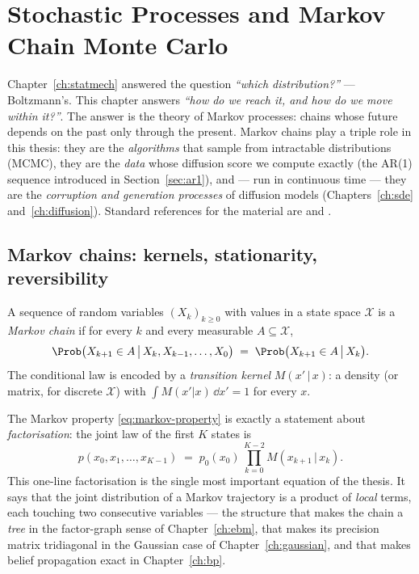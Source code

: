 \chapter{Stochastic Processes and Markov Chain Monte Carlo}\label{ch:stochproc}

Chapter~\ref{ch:statmech} answered the question \emph{``which distribution?''}
--- Boltzmann's. This chapter answers \emph{``how do we reach it, and how do
we move within it?''}. The answer is the theory of Markov processes: chains
whose future depends on the past only through the present. Markov chains play
a triple role in this thesis: they are the \emph{algorithms} that sample from
intractable distributions (MCMC), they are the \emph{data} whose diffusion
score we compute exactly (the AR(1) sequence introduced in
Section~\ref{sec:ar1}), and --- run in continuous time --- they are the
\emph{corruption and generation processes} of diffusion models
(Chapters~\ref{ch:sde} and~\ref{ch:diffusion}). Standard references for the
material are \citet{robert2004monte} and \citet{brockwell1991time}.

\section{Markov chains: kernels, stationarity, reversibility}
\label{sec:markov}

\begin{definition}
A sequence of random variables $(X_k)_{k \geq 0}$ with values in a state
space $\mathcal{X}$ is a \emph{Markov chain} if for every $k$ and every
measurable $A \subseteq \mathcal{X}$,
\begin{equation}
  \Prob\big(X_{k+1} \in A \,\big|\, X_k, X_{k-1}, \dots, X_0\big)
  \;=\; \Prob\big(X_{k+1} \in A \,\big|\, X_k\big) .
  \label{eq:markov-property}
\end{equation}
The conditional law is encoded by a \emph{transition kernel}
$M(x' \,|\, x)$: a density (or matrix, for discrete $\mathcal{X}$) with
$\int M(x'|x)\,\dd x' = 1$ for every $x$.
\end{definition}

The Markov property \eqref{eq:markov-property} is exactly a statement about
\emph{factorisation}: the joint law of the first $K$ states is
\begin{equation}
  p(x_0, x_1, \dots, x_{K-1})
  \;=\; p_0(x_0)\, \prod_{k=0}^{K-2} M(x_{k+1} \,|\, x_k) .
  \label{eq:chain-factorisation}
\end{equation}
This one-line factorisation is the single most important equation of the
thesis. It says that the joint distribution of a Markov trajectory is a
product of \emph{local} terms, each touching two consecutive variables ---
the structure that makes the chain a \emph{tree} in the factor-graph sense of
Chapter~\ref{ch:ebm}, that makes its precision matrix tridiagonal in the
Gaussian case of Chapter~\ref{ch:gaussian}, and that makes belief propagation
exact in Chapter~\ref{ch:bp}.

